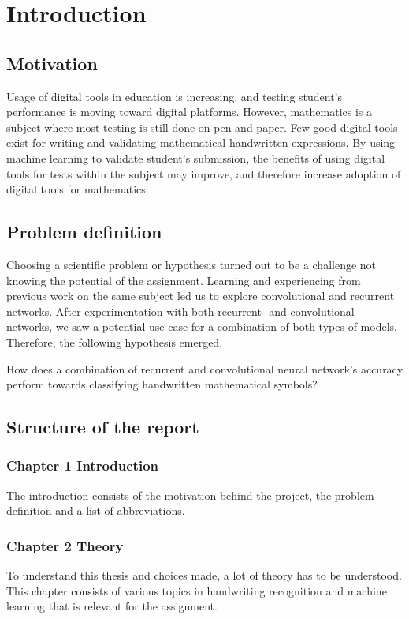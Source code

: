 \chapter{Introduction}

\section{Motivation}

Usage of digital tools in education is increasing, and testing student's performance is moving toward digital platforms. However, mathematics is a subject where most testing is still done on pen and paper. Few good digital tools exist for writing and validating mathematical handwritten expressions. By using machine learning to validate student's submission, the benefits of using digital tools for tests within the subject may improve, and therefore increase adoption of digital tools for mathematics.

\section{Problem definition} 
\label{problem_definition}

Choosing a scientific problem or hypothesis turned out to be a challenge not knowing the potential of the assignment. Learning and experiencing from previous work on the same subject led us to explore convolutional and recurrent networks. After experimentation with both recurrent- and convolutional networks, we saw a potential use case for a combination of both types of models. Therefore, the following hypothesis emerged.

How does a combination of recurrent and convolutional neural network's accuracy perform towards classifying handwritten mathematical symbols?

\section{Structure of the report}
\subsection{Chapter 1 Introduction}
The introduction consists of the motivation behind the project, the problem definition and a list of abbreviations.

\subsection{Chapter 2 Theory}
To understand this thesis and choices made, a lot of theory has to be understood. This chapter consists of various topics in handwriting recognition and machine learning that is relevant for the assignment.

